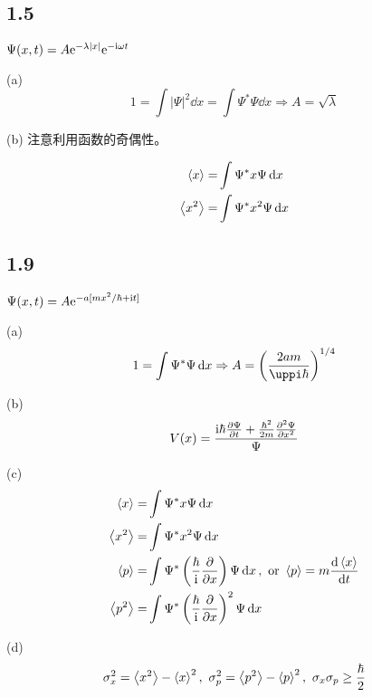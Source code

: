 \subsection{1.5}

\begin{framed}
    $\Psi (x, t) = A \mathrm{e}^{- \lambda |x|} \mathrm{e}^{- \mathrm{i} \omega t}$

    (a)
    \[
        1 = \int |\Psi|^2 \dd{x} = \int \Psi^* \Psi \dd{x} \Rightarrow A = \sqrt{\lambda}
    \]

    (b)
    注意利用函数的奇偶性。

    \begin{align*}
        \expval{x} =   & \int \Psi^* x \Psi \dd{x}   \\
        \expval{x^2} = & \int \Psi^* x^2 \Psi \dd{x}
    \end{align*}
\end{framed}

\subsection{1.9}

\begin{framed}
    $\Psi(x, t) = A \mathrm{e}^{- a [m x^2 / \hbar + \mathrm{i} t]}$

    (a)
    \[
        1 = \int \Psi^* \Psi \dd{x} \Rightarrow A = \qty(\frac{2 a m}{\uppi \hbar})^{1/4}
    \]

    (b)
    \[
        V(x) = \frac{\mathrm{i} \hbar \pdv{\Psi}{t} + \frac{\hbar^2}{2 m} \pdv[2]{\Psi}{x}}{\Psi}
    \]

    (c)
    \begin{align*}
        \expval{x} =   & \int \Psi^* x \Psi \dd{x}                                                                                      \\
        \expval{x^2} = & \int \Psi^* x^2 \Psi \dd{x}                                                                                    \\
        \expval{p} =   & \int \Psi^* \left(\frac{\hbar}{\mathrm{i}} \pdv{}{x}\right) \Psi \dd{x},\text{ or }\expval{p} = m \dv{\expval{x}}{t} \\
        \expval{p^2} = & \int \Psi^* \left(\frac{\hbar}{\mathrm{i}} \pdv{}{x}\right)^2 \Psi \dd{x}                                            \\
    \end{align*}

    (d)
    \[
        \sigma_x^2 = \expval{x^2} - \expval{x}^2,\ \sigma_p^2 = \expval{p^2} - \expval{p}^2,\ \sigma_x \sigma_p \geq \frac{\hbar}{2}
    \]
\end{framed}

